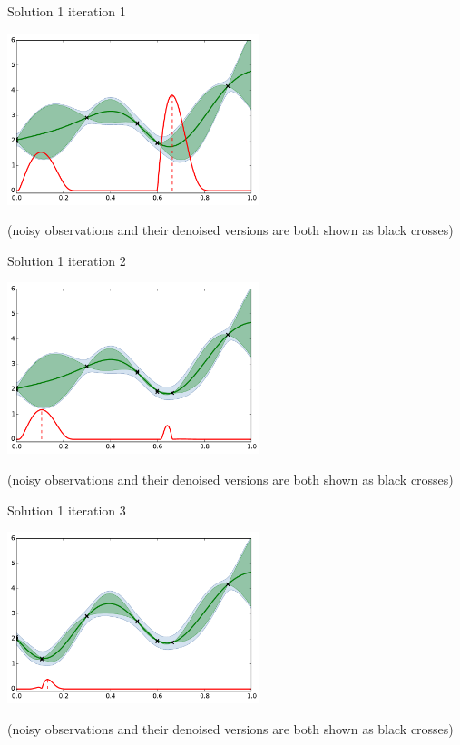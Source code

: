 \documentclass{beamer}
\begin{document}
\begin{frame}[noframenumbering]{Solution 1}
iteration 1
\begin{center}
\includegraphics[height=5cm]{figures/python/ego_EI1n1}
\end{center}
\tiny (noisy observations and their denoised versions are both shown as black crosses)\\
\end{frame}

\begin{frame}[noframenumbering]{Solution 1}
iteration 2
\begin{center}
\includegraphics[height=5cm]{figures/python/ego_EI1n2}
\end{center}
\tiny (noisy observations and their denoised versions are both shown as black crosses)\\
\end{frame}

\begin{frame}[noframenumbering]{Solution 1}
iteration 3
\begin{center}
\includegraphics[height=5cm]{figures/python/ego_EI1n3}
\end{center}
\tiny (noisy observations and their denoised versions are both shown as black crosses)\\
\end{frame}
\end{document}
